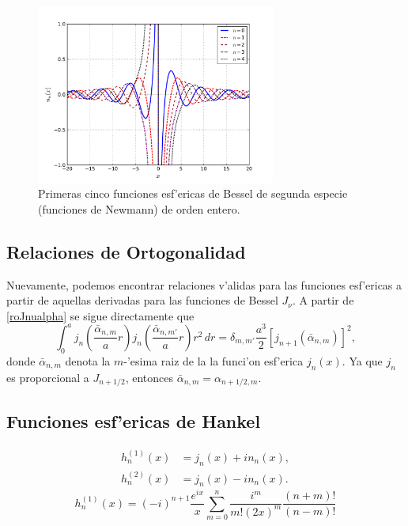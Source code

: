 %
\begin{figure}[H]
\centering
\includegraphics[angle=0,width=0.7\textwidth]{figs/fig-Bessel-Esferica-n.pdf}
\caption{Primeras cinco funciones esf'ericas de Bessel de segunda especie (funciones de Newmann) de orden entero.}
\label{fig-nn}
\end{figure}


\subsection{Relaciones de Ortogonalidad}
Nuevamente, podemos encontrar relaciones v'alidas para las funciones esf'ericas a partir de aquellas derivadas para las funciones de Bessel $J_\nu$. A partir de \eqref{roJnualpha} se sigue directamente que
\begin{equation}\label{rojnualpha}
\boxed{\int_0^a j_n\left(\frac{\bar{\alpha}_{n,m}}{a}r\right)j_n\left(\frac{\bar{\alpha}_{n,m'}}{a}r\right)r^2\,dr
=\delta_{m,m'}\frac{a^3}{2}\left[j_{n+1}(\bar{\alpha}_{n,m})\right]^2,}
\end{equation}
donde $\bar{\alpha}_{n,m}$ denota la $m$-'esima raiz de la la funci'on esf'erica $j_n(x)$. Ya que $j_n$ es proporcional a $J_{n+1/2}$, entonces $\bar{\alpha}_{n,m}=\alpha_{n+1/2,m}$.


\subsection{Funciones esf'ericas de Hankel} 
\begin{align}
h_n^{(1)}(x) &= j_n(x) + i n_n(x) , \\
h_n^{(2)}(x) &= j_n(x) - i n_n(x).
\end{align}
\begin{equation}
h_n^{(1)}(x) = (-i)^{n+1} \frac{e^{ix}}{x} \sum_{m=0}^n \frac{i^m}{m!(2x)^m} \frac{(n+m)!}{(n-m)!}
\end{equation}

